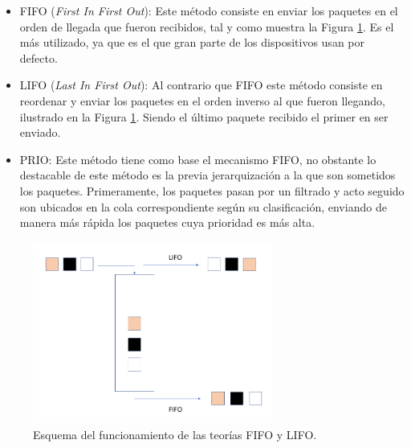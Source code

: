 	\begin{itemize}
	    \item FIFO (\textit{First In First Out}): Este método consiste en enviar los paquetes en el orden de llegada que fueron recibidos, tal y como muestra la Figura \ref{fifolifo}. Es el más utilizado, ya que es el que gran parte de los dispositivos usan por defecto.
	    \item LIFO (\textit{Last In First Out}): Al contrario que FIFO este método consiste en reordenar y enviar los paquetes en el orden inverso al que fueron llegando, ilustrado en la Figura \ref{fifolifo}. Siendo el último paquete recibido el primer en ser enviado. 
	    \item PRIO: Este método tiene como base el mecanismo FIFO, no obstante lo destacable de este método es la previa jerarquización a la que son sometidos los paquetes. Primeramente, los paquetes pasan por un filtrado y acto seguido son ubicados en la cola correspondiente según su clasificación, enviando de manera más rápida los paquetes cuya prioridad es más alta. 
	\end{itemize}
	
	\begin{figure}[H]
			\centering
			\includegraphics[width=0.7\textwidth]{img/fifolifo.PNG}
			\caption{Esquema del funcionamiento de las teorías FIFO y LIFO.}
			\label{fifolifo}
		\end{figure}

